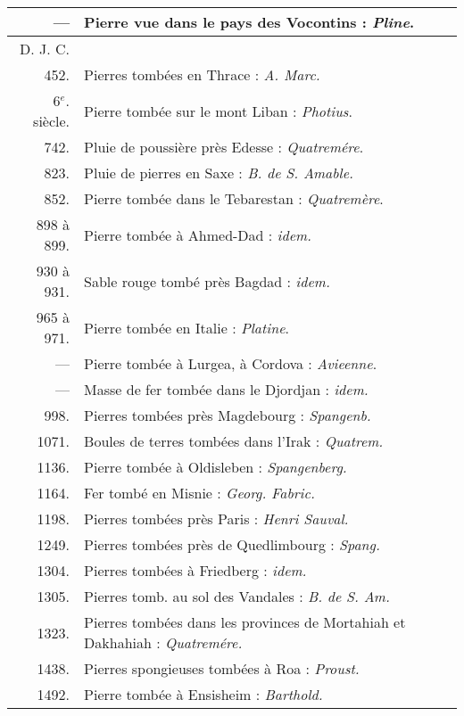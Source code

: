 \documentclass[a4paper, 12pt, oneside, french]{article}
\begin{document}
\begin{center}
\begin{longtable}{r p{85mm}}
        --- & Pierre vue dans le pays des Vocontins : \emph{Pline}.   \\ \hline\hline
        D. J. C. & \\ \hline\hline
        452. & Pierres tombées en Thrace : \emph{A. Marc.}   \\ \hline
        6$^{e}$. siècle. & Pierre tombée sur le mont Liban : \emph{Photius}.   \\ \hline
        742. & Pluie de poussière près Edesse : \emph{Quatremére}.   \\ \hline
        823. & Pluie de pierres en Saxe : \emph{B. de S. Amable.}   \\ \hline
        852. & Pierre tombée dans le Tebarestan : \emph{Quatremère}.   \\ \hline
        898 à 899. & Pierre tombée à Ahmed-Dad : \emph{idem.}   \\ \hline
        930 à 931. & Sable rouge tombé près Bagdad : \emph{idem.}   \\ \hline
        965 à 971. & Pierre tombée en Italie : \emph{Platine}.   \\ \hline
        --- & Pierre tombée à Lurgea, à Cordova : \emph{Avieenne}.   \\ \hline
        --- & Masse de fer tombée dans le Djordjan : \emph{idem.}   \\ \hline
        998. & Pierres tombées près Magdebourg : \emph{Spangenb.}   \\ \hline
        1071. & Boules de terres tombées dans l'Irak : \emph{Quatrem.}   \\ \hline
        1136. & Pierre tombée à Oldisleben : \emph{Spangenberg.}   \\ \hline
        1164. & Fer tombé en Misnie : \emph{Georg. Fabric.}   \\ \hline
        1198. & Pierres tombées près Paris : \emph{Henri Sauval.}   \\ \hline
        1249. & Pierres tombées près de Quedlimbourg : \emph{Spang.}   \\ \hline
        1304. & Pierres tombées à Friedberg : \emph{idem.}   \\ \hline
        1305. & Pierres tomb. au sol des Vandales : \emph{B. de S. Am.}   \\ \hline
        1323. & Pierres tombées dans les provinces de Mortahiah et Dakhahiah : \emph{Quatremére.}   \\ \hline
        1438. & Pierres spongieuses tombées à Roa : \emph{Proust.}   \\ \hline
        1492. & Pierre tombée à Ensisheim : \emph{Barthold.}   \\ \hline

\end{longtable}
\end{center}
\end{document}
